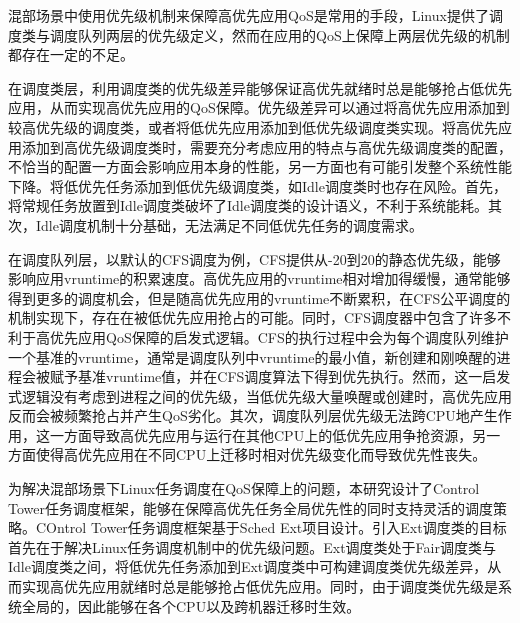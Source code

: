 
混部场景中使用优先级机制来保障高优先应用QoS是常用的手段，Linux提供了调度类与调度队列两层的优先级定义，然而在应用的QoS上保障上两层优先级的机制都存在一定的不足。

在调度类层，利用调度类的优先级差异能够保证高优先就绪时总是能够抢占低优先应用，从而实现高优先应用的QoS保障。优先级差异可以通过将高优先应用添加到较高优先级的调度类，或者将低优先应用添加到低优先级调度类实现。将高优先应用添加到高优先级调度类时，需要充分考虑应用的特点与高优先级调度类的配置，不恰当的配置一方面会影响应用本身的性能，另一方面也有可能引发整个系统性能下降。将低优先任务添加到低优先级调度类，如Idle调度类时也存在风险。首先，将常规任务放置到Idle调度类破坏了Idle调度类的设计语义，不利于系统能耗。其次，Idle调度机制十分基础，无法满足不同低优先任务的调度需求。

在调度队列层，以默认的CFS调度为例，CFS提供从-20到20的静态优先级，能够影响应用vruntime的积累速度。高优先应用的vruntime相对增加得缓慢，通常能够得到更多的调度机会，但是随高优先应用的vruntime不断累积，在CFS公平调度的机制实现下，存在在被低优先应用抢占的可能。同时，CFS调度器中包含了许多不利于高优先应用QoS保障的启发式逻辑。CFS的执行过程中会为每个调度队列维护一个基准的vruntime，通常是调度队列中vruntime的最小值，新创建和刚唤醒的进程会被赋予基准vruntime值，并在CFS调度算法下得到优先执行。然而，这一启发式逻辑没有考虑到进程之间的优先级，当低优先级大量唤醒或创建时，高优先应用反而会被频繁抢占并产生QoS劣化。其次，调度队列层优先级无法跨CPU地产生作用，这一方面导致高优先应用与运行在其他CPU上的低优先应用争抢资源，另一方面使得高优先应用在不同CPU上迁移时相对优先级变化而导致优先性丧失。

为解决混部场景下Linux任务调度在QoS保障上的问题，本研究设计了Control Tower任务调度框架，能够在保障高优先任务全局优先性的同时支持灵活的调度策略。COntrol Tower任务调度框架基于Sched Ext项目设计。引入Ext调度类的目标首先在于解决Linux任务调度机制中的优先级问题。Ext调度类处于Fair调度类与Idle调度类之间，将低优先任务添加到Ext调度类中可构建调度类优先级差异，从而实现高优先应用就绪时总是能够抢占低优先应用。同时，由于调度类优先级是系统全局的，因此能够在各个CPU以及跨机器迁移时生效。


